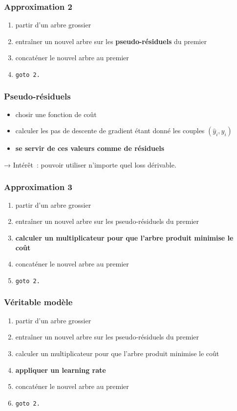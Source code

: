 \documentclass{formation}
\begin{document}
\begin{frame}
  \frametitle{Approximation 2}

  \begin{enumerate}
  \item partir d'un arbre grossier
  \item entraîner un nouvel arbre sur les \textbf{pseudo-résiduels} du
    premier
  \item concaténer le nouvel arbre au premier
  \item \texttt{goto 2.}
  \end{enumerate}

\end{frame}

\begin{frame}
  \frametitle{Pseudo-résiduels}
  \begin{itemize}
  \item chosir une fonction de coût
  \item calculer les pas de descente de gradient étant donné les
    couples $(\hat{y}_i, y_i)$
  \item \textbf{se servir de ces valeurs comme de résiduels}
  \end{itemize}

  → Intérêt : pouvoir utiliser n'importe quel loss dérivable.
\end{frame}

\begin{frame}
  \frametitle{Approximation 3}
  \begin{enumerate}
  \item partir d'un arbre grossier
  \item entraîner un nouvel arbre sur les pseudo-résiduels du premier
  \item \textbf{calculer un multiplicateur pour que l'arbre produit
      minimise le coût}
  \item concaténer le nouvel arbre au premier
  \item \texttt{goto 2.}
  \end{enumerate}
\end{frame}

\begin{frame}
  \frametitle{Véritable modèle}
  \begin{enumerate}
  \item partir d'un arbre grossier
  \item entraîner un nouvel arbre sur les pseudo-résiduels du premier
  \item calculer un multiplicateur pour que l'arbre produit minimise
    le coût
  \item \textbf{appliquer un learning rate}
  \item concaténer le nouvel arbre au premier
  \item \texttt{goto 2.}
  \end{enumerate}
\end{frame}
\end{document}

